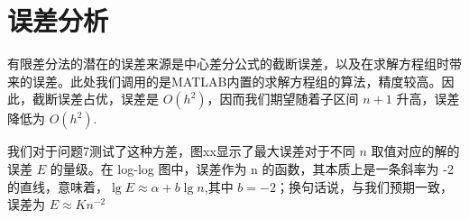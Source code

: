\documentclass{ctexart}
\numberwithin{equation}{section}
\begin{document}
\section{误差分析}
有限差分法的潜在的误差来源是中心差分公式的截断误差，以及在求解方程组时带来的误差。此处我们调用的是MATLAB内置的求解方程组的算法，精度较高。因此，截断误差占优，误差是 $O(h^2)$，因而我们期望随着子区间 $n+1$ 升高，误差降低为 $O(h^{2})$.

我们对于问题7测试了这种方差，图xx显示了最大误差对于不同 $n$ 取值对应的解的误差 $E$ 的量级。在 log-log 图中，误差作为 n 的函数，其本质上是一条斜率为 -2 的直线，意味着，$\lg E \approx \alpha + b\lg n$,其中 $b=-2$；换句话说，与我们预期一致，误差为 $E\approx Kn^{-2}$
\end{document}
